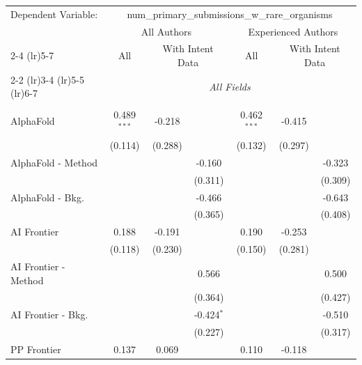 \begingroup
\centering
\begin{tabular}{lcccccc}
   \tabularnewline \midrule \midrule
   Dependent Variable: & \multicolumn{6}{c}{num\_primary\_submissions\_w\_rare\_organisms}\\
 & \multicolumn{3}{c}{All Authors} & \multicolumn{3}{c}{Experienced Authors} \\
\cmidrule(lr){2-4} \cmidrule(lr){5-7}
 & \multicolumn{1}{c}{All} & \multicolumn{2}{c}{With Intent Data} & \multicolumn{1}{c}{All} & \multicolumn{2}{c}{With Intent Data} \\
\cmidrule(lr){2-2} \cmidrule(lr){3-4} \cmidrule(lr){5-5} \cmidrule(lr){6-7}
 & \multicolumn{6}{c}{\textit{All Fields}} \\ \\
   AlphaFold            & 0.489$^{***}$ & -0.218  &              & 0.462$^{***}$ & -0.415  &   \\   
                        & (0.114)       & (0.288) &              & (0.132)       & (0.297) &   \\   
   AlphaFold - Method   &               &         & -0.160       &               &         & -0.323\\   
                        &               &         & (0.311)      &               &         & (0.309)\\   
   AlphaFold - Bkg.     &               &         & -0.466       &               &         & -0.643\\   
                        &               &         & (0.365)      &               &         & (0.408)\\   
   AI Frontier          & 0.188         & -0.191  &              & 0.190         & -0.253  &   \\   
                        & (0.118)       & (0.230) &              & (0.150)       & (0.281) &   \\   
   AI Frontier - Method &               &         & 0.566        &               &         & 0.500\\   
                        &               &         & (0.364)      &               &         & (0.427)\\   
   AI Frontier - Bkg.   &               &         & -0.424$^{*}$ &               &         & -0.510\\   
                        &               &         & (0.227)      &               &         & (0.317)\\   
   PP Frontier          & 0.137         & 0.069   &              & 0.110         & -0.118  &   \\   

\end{tabular}
